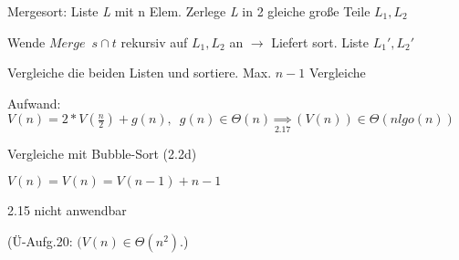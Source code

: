 Mergesort: Liste \textit{L} mit n Elem. Zerlege \textit{L} in 2 gleiche große Teile $L_1, L_2$

Wende $Merge \enspace s\cap t$ rekursiv auf $L_1,L_2$ an $\rightarrow$ Liefert sort. Liste $L_1', L_2'$

Vergleiche die beiden Listen und sortiere. \quad Max. $n-1$ Vergleiche

Aufwand: $V(n) = 2*V(\frac{n}{2})+g(n),\enspace g(n) \in \Theta (n) \underset{2.17}{\Rightarrow} (V(n)) \in \Theta(n lgo(n))$

Vergleiche mit Bubble-Sort (2.2d)

$V(n) = V(n) = V(n-1) + n-1$

2.15 nicht anwendbar

(Ü-Aufg.20: $(V(n)\in \Theta (n^2)$.)
 



